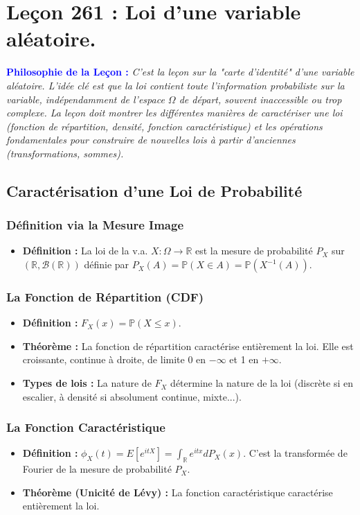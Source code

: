 \documentclass[12pt, a4paper, parskip=full]{report}
\theoremstyle{agregstyle}
\newenvironment{philosophie}
  {\par\medskip\noindent\begin{oframed}\noindent\textbf{\textcolor{blue}{Philosophie de la Leçon :}}\itshape}
  {\end{oframed}\par\medskip}
\begin{document}
\chapter{Leçon 261 : Loi d'une variable aléatoire.}

\begin{philosophie}
    C'est la leçon sur la "carte d'identité" d'une variable aléatoire. L'idée clé est que la loi contient \textit{toute} l'information probabiliste sur la variable, indépendamment de l'espace $\Omega$ de départ, souvent inaccessible ou trop complexe. La leçon doit montrer les différentes manières de caractériser une loi (fonction de répartition, densité, fonction caractéristique) et les opérations fondamentales pour construire de nouvelles lois à partir d'anciennes (transformations, sommes).
\end{philosophie}

\section{Caractérisation d'une Loi de Probabilité}
\subsection{Définition via la Mesure Image}
\begin{itemize}
    \item \textbf{Définition :} La loi de la v.a. $X: \Omega \to \mathbb{R}$ est la mesure de probabilité $P_X$ sur $(\mathbb{R}, \mathcal{B}(\mathbb{R}))$ définie par $P_X(A) = \mathbb{P}(X \in A) = \mathbb{P}(X^{-1}(A))$.
\end{itemize}
\subsection{La Fonction de Répartition (CDF)}
\begin{itemize}
    \item \textbf{Définition :} $F_X(x) = \mathbb{P}(X \le x)$.
    \item \textbf{Théorème :} La fonction de répartition caractérise entièrement la loi. Elle est croissante, continue à droite, de limite 0 en $-\infty$ et 1 en $+\infty$.
    \item \textbf{Types de lois :} La nature de $F_X$ détermine la nature de la loi (discrète si en escalier, à densité si absolument continue, mixte...).
\end{itemize}
\subsection{La Fonction Caractéristique}
\begin{itemize}
    \item \textbf{Définition :} $\phi_X(t) = E[e^{itX}] = \int_\mathbb{R} e^{itx} dP_X(x)$. C'est la transformée de Fourier de la mesure de probabilité $P_X$.
    \item \textbf{Théorème (Unicité de Lévy) :} La fonction caractéristique caractérise entièrement la loi.
\end{itemize}
\end{document}
